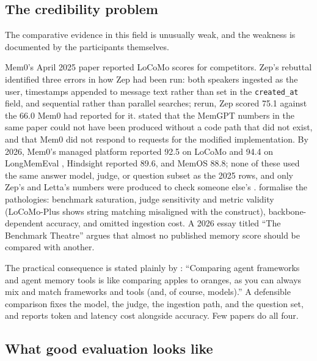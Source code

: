 \documentclass[11pt]{article}
\begin{document}
\subsection{The credibility problem}
\label{sec:credibility}

The comparative evidence in this field is unusually weak, and the weakness is documented by the participants themselves.

Mem0's April 2025 paper reported LoCoMo scores for competitors. Zep's rebuttal \citep{zep2025rebuttal} identified three errors in how Zep had been run: both speakers ingested as the user, timestamps appended to message text rather than set in the \texttt{created\_at} field, and sequential rather than parallel searches; rerun, Zep scored 75.1 against the 66.0 Mem0 had reported for it. \citet{letta2025filesystem} stated that the MemGPT numbers in the same paper could not have been produced without a code path that did not exist, and that Mem0 did not respond to requests for the modified implementation. By 2026, Mem0's managed platform reported 92.5 on LoCoMo and 94.4 on LongMemEval \citep{mem0_2026state}, Hindsight reported 89.6, and MemOS 88.8; none of these used the same answer model, judge, or question subset as the 2025 rows, and only Zep's and Letta's numbers were produced to check someone else's \citep{kumar2026agentmemory}. \citet{jiang2026anatomy} formalise the pathologies: benchmark saturation, judge sensitivity and metric validity (LoCoMo-Plus shows string matching misaligned with the construct), backbone-dependent accuracy, and omitted ingestion cost. A 2026 essay titled ``The Benchmark Theatre'' \citep{bloomind2026} argues that almost no published memory score should be compared with another.

The practical consequence is stated plainly by \citet{letta2025filesystem}: ``Comparing agent frameworks and agent memory tools is like comparing apples to oranges, as you can always mix and match frameworks and tools (and, of course, models).'' A defensible comparison fixes the model, the judge, the ingestion path, and the question set, and reports token and latency cost alongside accuracy. Few papers do all four.

\subsection{What good evaluation looks like}
\end{document}
